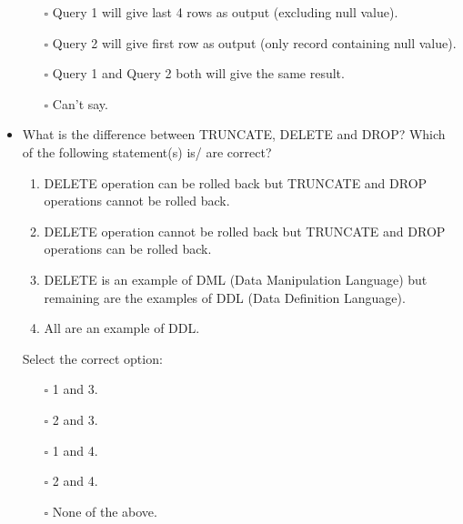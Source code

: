 \documentclass[10pt]{article}
\begin{document}
\begin{itemize}
				\begin{enumerate}
					\item[$\square$] Query 1 will give last 4 rows as output (excluding null value).
					\item[$\square$] Query 2 will give first row as output (only record containing null value).
					\item[$\square$] Query 1 and Query 2 both will give the same result.
					\item[$\square$] Can’t say.
				\end{enumerate}

			\item What is the difference between TRUNCATE, DELETE and DROP? Which of the following statement(s) is/ are correct?
				\begin{enumerate}
					\item DELETE operation can be rolled back but TRUNCATE and DROP operations cannot be rolled back.
					\item DELETE operation cannot be rolled back but TRUNCATE and DROP operations can be rolled back.
					\item DELETE is an example of DML (Data Manipulation Language) but remaining are the examples of DDL (Data Definition Language).
					\item All are an example of DDL.
				\end{enumerate}
				Select the correct option:
				\begin{enumerate}
					\item[$\square$] 1 and 3.
					\item[$\square$] 2 and 3.
					\item[$\square$] 1 and 4.
					\item[$\square$] 2 and 4.
					\item[$\square$] None of the above.
				\end{enumerate}
			
			\newpage


\end{itemize}
\end{document}
